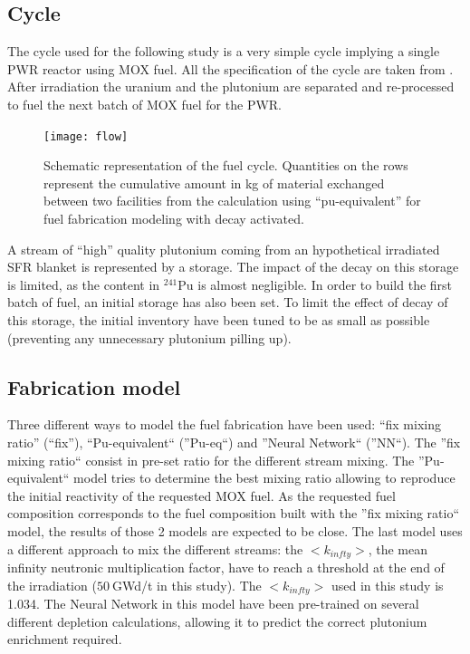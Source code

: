 \documentclass{anstrans}
\begin{document}
\subsection{Cycle} 

The cycle used for the following study is a very simple cycle
implying a single PWR reactor using MOX fuel. All the specification of the cycle
are taken from \cite{Bo}. After irradiation the uranium and the plutonium are
separated and re-processed to fuel the next batch of MOX fuel for the PWR.

\begin{figure}[ht] %
  \centering
  \texttt{[image: flow]}
  \caption{Schematic representation of the fuel cycle. Quantities on the rows
  represent the cumulative amount in kg of material exchanged between two
facilities from the calculation using ``pu-equivalent'' for fuel fabrication
modeling with decay activated.}
  \label{fig:flow}
\end{figure}

A stream of ``high'' quality plutonium coming from an hypothetical irradiated
SFR blanket is represented by a storage. The impact of the decay on this storage
is limited, as the content in $^{241}$Pu is almost negligible. In order to build
the first batch of fuel, an initial storage has also been set. To limit the
effect of decay of this storage, the initial inventory have been tuned to be as
small as possible (preventing any unnecessary plutonium pilling up).


\subsection{Fabrication model}

Three different ways to model the fuel fabrication have been used: ``fix mixing
ratio'' (``fix''), ``Pu-equivalent`` (''Pu-eq``) and ''Neural Network``
(''NN``). The ''fix mixing ratio`` consist in pre-set ratio for the different
stream mixing. The ''Pu-equivalent`` model tries to determine the best mixing
ratio allowing to reproduce the initial reactivity of the requested MOX fuel. As
the requested fuel composition corresponds to the fuel composition built with
the ''fix mixing ratio`` model, the results of those 2 models are expected to be
close. The last model uses a different approach to mix the different streams:
the $<k_{infty}>$, the mean infinity neutronic multiplication factor, have to
reach a threshold at the end of the irradiation ($50~$GWd/t in this study). The
$<k_{infty}>$ used in this study is 1.034. The Neural Network in this model have
been pre-trained on several different depletion calculations, allowing it to
predict the correct plutonium enrichment required.
\end{document}
